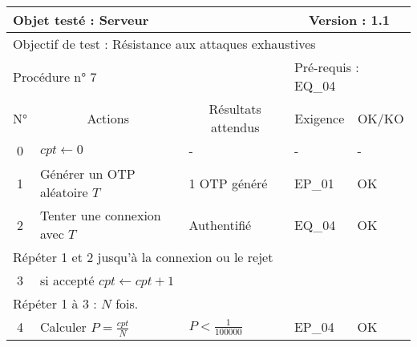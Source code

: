 \documentclass{"../../res/univ-projet"}
\begin{document}
\begin{center}
    \vskip 2.2cm 
    \begin{tabular}{|c|p{5cm}|p{5cm}|p{1.5cm}|p{1.5cm}|}
      \hline
      \multicolumn{3}{|l|}{Objet testé : Serveur} & \multicolumn{2}{c|}{Version : 1.1}\\ \hline
      \multicolumn{5}{|l|}{Objectif de test : Résistance aux attaques exhaustives}\\ \hline
      \multicolumn{3}{|l|}{Procédure n° 7} & \multicolumn{2}{p{3cm}|}{Pré-requis : EQ\_04 }\\ \hline
      \multicolumn{1}{|c|}{N°} & \multicolumn{1}{c|}{Actions} & \multicolumn{1}{c|}{Résultats attendus} & 
      \multicolumn{1}{c|}{Exigence} & \multicolumn{1}{c|}{OK/KO}\\ \hline
      0 & $cpt \leftarrow 0$ & - & - & -\\
      1 & Générer un OTP aléatoire $T$ & 1 OTP généré & EP\_01 & OK\\
      2 & Tenter une connexion avec $T$ & Authentifié & EQ\_04 & OK \\ \hline      
      \multicolumn{5}{|l|}{Répéter 1 et 2 jusqu'à la connexion ou le rejet}\\
      \hline
      3 & si accepté $cpt \leftarrow cpt + 1$ & & & \\
      \hline
      \multicolumn{5}{|l|}{Répéter 1 à 3 : $N$ fois.}\\
      \hline
      4 & Calculer $P = \frac{cpt}{N}$ & $P < \frac{1}{100000}$ & EP\_04 & OK \\ \hline 
    \end{tabular}  
  \end{center}
  
\end{document}

